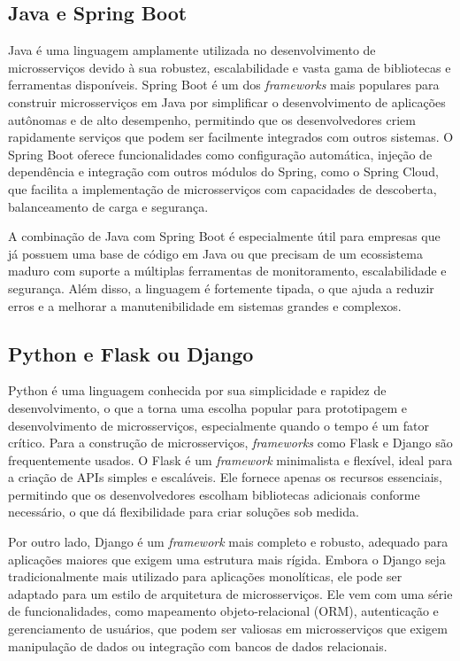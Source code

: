 \subsection{Java e Spring Boot}
Java é uma linguagem amplamente utilizada no desenvolvimento de microsserviços devido à sua robustez, escalabilidade e vasta gama de bibliotecas e ferramentas disponíveis. Spring Boot é um dos \emph{frameworks} mais populares para construir microsserviços em Java por simplificar o desenvolvimento de aplicações autônomas e de alto desempenho, permitindo que os desenvolvedores criem rapidamente serviços que podem ser facilmente integrados com outros sistemas. O Spring Boot oferece funcionalidades como configuração automática, injeção de dependência e integração com outros módulos do Spring, como o Spring Cloud, que facilita a implementação de microsserviços com capacidades de descoberta, balanceamento de carga e segurança. 
\cite{springboot}

A combinação de Java com Spring Boot é especialmente útil para empresas que já possuem uma base de código em Java ou que precisam de um ecossistema maduro com suporte a múltiplas ferramentas de monitoramento, escalabilidade e segurança. Além disso, a linguagem é fortemente tipada, o que ajuda a reduzir erros e a melhorar a manutenibilidade em sistemas grandes e complexos.

\subsection{Python e Flask ou Django}

Python é uma linguagem conhecida por sua simplicidade e rapidez de desenvolvimento, o que a torna uma escolha popular para prototipagem e desenvolvimento de microsserviços, especialmente quando o tempo é um fator crítico. Para a construção de microsserviços, \emph{frameworks} como Flask e Django são frequentemente usados. O Flask é um \emph{framework} minimalista e flexível, ideal para a criação de APIs simples e escaláveis. Ele fornece apenas os recursos essenciais, permitindo que os desenvolvedores escolham bibliotecas adicionais conforme necessário, o que dá flexibilidade para criar soluções sob medida. 
\cite{flask}

Por outro lado, Django é um \emph{framework} mais completo e robusto, adequado para aplicações maiores que exigem uma estrutura mais rígida. Embora o Django seja tradicionalmente mais utilizado para aplicações monolíticas, ele pode ser adaptado para um estilo de arquitetura de microsserviços. Ele vem com uma série de funcionalidades, como mapeamento objeto-relacional (ORM), autenticação e gerenciamento de usuários, que podem ser valiosas em microsserviços que exigem manipulação de dados ou integração com bancos de dados relacionais. 
\cite{django}

